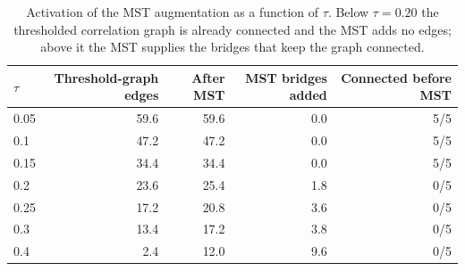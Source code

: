 \begin{table}[t]
\centering
\caption{Activation of the MST augmentation as a function of $\tau$. Below $\tau=0.20$ the thresholded correlation graph is already connected and the MST adds no edges; above it the MST supplies the bridges that keep the graph connected.}
\label{tab:mstactivation}
\footnotesize
\begin{tabular}{lrrrr}
\toprule
$\tau$ & Threshold-graph edges & After MST & MST bridges added & Connected before MST \\
\midrule
0.05 & 59.6 & 59.6 & 0.0 & 5/5 \\
0.1 & 47.2 & 47.2 & 0.0 & 5/5 \\
0.15 & 34.4 & 34.4 & 0.0 & 5/5 \\
0.2 & 23.6 & 25.4 & 1.8 & 0/5 \\
0.25 & 17.2 & 20.8 & 3.6 & 0/5 \\
0.3 & 13.4 & 17.2 & 3.8 & 0/5 \\
0.4 & 2.4 & 12.0 & 9.6 & 0/5 \\
\bottomrule
\end{tabular}
\end{table}
